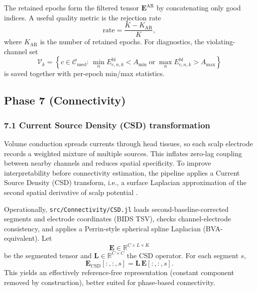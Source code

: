The retained epochs form the filtered tensor $\mathbf{E}^{\mathrm{AR}}$ by concatenating only good indices. A useful quality metric is the rejection rate
\[
\mathrm{rate}=\frac{K-K_{\mathrm{AR}}}{K},
\]
where $K_{\mathrm{AR}}$ is the number of retained epochs. For diagnostics, the violating-channel set
\[
\mathcal{V}_k=
\left\{
c\in\mathcal{C}_{\mathrm{used}}:\,
\min_n E^{\mathrm{bl}}_{c,n,k}<A_{\min}
\;\text{or}\;
\max_n E^{\mathrm{bl}}_{c,n,k}>A_{\max}
\right\}
\]
is saved together with per-epoch min/max statistics.

\subsection{Phase 7 (Connectivity)}

\subsubsection*{7.1 Current Source Density (CSD) transformation}
Volume conduction spreads currents through head tissues, so each scalp electrode records a weighted mixture of multiple sources. This inflates zero-lag coupling between nearby channels and reduces spatial specificity. To improve interpretability before connectivity estimation, the pipeline applies a Current Source Density (CSD) transform, i.e., a surface Laplacian approximation of the second spatial derivative of scalp potential \citep{Cohen2014}.

Operationally, \texttt{src/Connectivity/CSD.jl} loads second-baseline-corrected segments and electrode coordinates (BIDS TSV), checks channel-electrode consistency, and applies a Perrin-style spherical spline Laplacian (BVA-equivalent). Let
\[
\mathbf{E}\in\mathbb{R}^{C\times L\times K}
\]
be the segmented tensor and $\mathbf{L}\in\mathbb{R}^{C\times C}$ the CSD operator. For each segment $s$,
\[
\mathbf{E}_{\mathrm{CSD}}[:,:,s]=\mathbf{L}\,\mathbf{E}[:,:,s].
\]
This yields an effectively reference-free representation (constant component removed by construction), better suited for phase-based connectivity.

